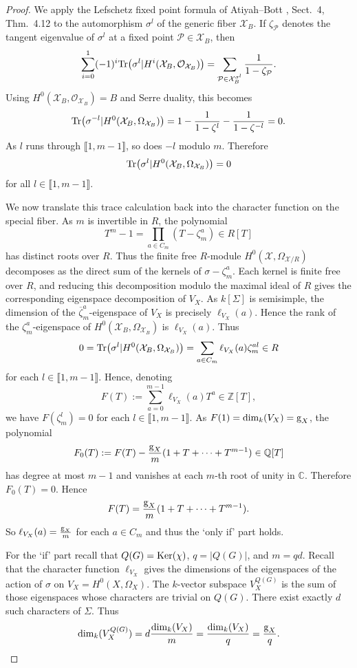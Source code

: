 \documentclass[11pt]{amsart}
\def\Ker{\textup{Ker}}
\begin{document}
\begin{proof}
We apply the Lefschetz fixed point formula of Atiyah--Bott \cite{AB}, Sect.\ 4, Thm.\ 4.12 to the automorphism $\sigma^l$ of the generic fiber $\mathcal X_B$. If $\zeta_{\mathcal P}$ denotes the tangent eigenvalue of $\sigma^l$ at a fixed point $\mathcal P\in\mathcal X_B$, then
$$\sum_{i=0}^1 (-1)^i\textup{Tr}\bigl(\sigma^l|H^i(\mathcal X_B,\mathcal O_{\mathcal X_B})\bigr)=\sum_{\mathcal P\in \mathcal X_B^{\sigma^l}}\frac{1}{1-\zeta_{\mathcal P}}.$$
Using $H^0(\mathcal X_B,\mathcal O_{\mathcal X_B})=B$ and Serre duality, this becomes
$$\textup{Tr}\bigl(\sigma^{-l}|H^0(\mathcal X_B,\Omega_{\mathcal X_B})\bigr)=
1-\frac{1}{1-\zeta^l}-\frac{1}{1-\zeta^{-l}}=0.$$
As $l$ runs through $\llbracket1,m-1\rrbracket$, so does $-l$ modulo $m$. Therefore
$$\textup{Tr}\bigl(\sigma^l|H^0(\mathcal X_B,\Omega_{\mathcal X_B})\bigr)=0$$
for all $l\in\llbracket1,m-1\rrbracket$.

We now translate this trace calculation back into the character function on the special fiber. As $m$ is invertible in $R$, the polynomial
$$T^m-1=\prod_{a\in C_m}(T-\zeta_m^a)\in R[T]$$
has distinct roots over $R$. Thus the finite free $R$-module $H^0(\mathcal X,\Omega_{\mathcal X/R})$ decomposes as the direct sum of the kernels of $\sigma-\zeta_m^a$. Each kernel is finite free over $R$, and reducing this decomposition modulo the maximal ideal of $R$ gives the corresponding eigenspace decomposition of $V_X$. As $k[\Sigma]$ is semisimple, the dimension of the $\overline{\zeta}_m^a$-eigenspace of $V_X$ is precisely $\ell_{V_X}(a)$. Hence the rank of the $\zeta_m^a$-eigenspace of $H^0(\mathcal X_B,\Omega_{\mathcal X_B})$ is $\ell_{V_X}(a)$. Thus
$$0=\textup{Tr}\bigl(\sigma^l|H^0(\mathcal X_B,\Omega_{\mathcal X_B})\bigr)
=\sum_{a\in C_m}\ell_{V_X}(a)\zeta_m^{al}\in R$$
for each $l\in\llbracket1,m-1\rrbracket$. Hence, denoting
$$F(T):=\sum_{a=0}^{m-1}\ell_{V_X}(a)T^a\in \mathbb Z[T],$$
we have $F(\zeta_m^l)=0$ for each $l\in\llbracket1,m-1\rrbracket$. As $F(1)=\dim_k(V_X)=\textup{g}_X$, the polynomial
$$F_0(T):=F(T)-\frac{\textup{g}_X}{m}(1+T+\cdots+T^{m-1})\in\mathbb Q[T]$$
has degree at most $m-1$ and vanishes at each $m$-th root of unity in $\mathbb C$. Therefore $F_0(T)=0$. Hence
$$F(T)=\frac{\textup{g}_X}{m}(1+T+\cdots+T^{m-1}).$$
So $\ell_{V_X}(a)=\frac{\textup{g}_X}{m}$ for each $a\in C_m$ and thus the `only if' part holds.

For the `if' part recall that $Q(G)=\Ker(\chi)$, $q=|Q(G)|$, and $m=qd$. Recall that the character function $\ell_{V_X}$ gives the dimensions of the eigenspaces of the action of $\sigma$ on $V_X=H^0(X,\Omega_X)$. The $k$-vector subspace $V_X^{Q(G)}$ is the sum of those eigenspaces whose characters are trivial on $Q(G)$. There exist exactly $d$ such characters of $\Sigma$. Thus
$$\dim_k(V_X^{Q(G)})=d\frac{\dim_k(V_X)}{m}=\frac{\dim_k(V_X)}{q}=\frac{\textup{g}_X}{q}.$$


\end{proof}
\end{document}
